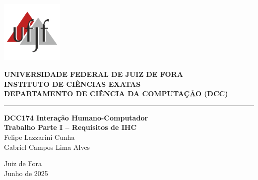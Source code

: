 \documentclass[12pt, a4paper, oneside]{abntex2}
\begin{document}
\begin{capa}
    \centering
    \begin{minipage}{0.2\textwidth}
        \includegraphics[width=3cm]{Imagens/ufjf-logo.png}
    \end{minipage}
    \hfill
    \begin{minipage}{0.7\textwidth}
        \raggedright
        \textbf{UNIVERSIDADE FEDERAL DE JUIZ DE FORA} \\
        \textbf{INSTITUTO DE CIÊNCIAS EXATAS} \\
        \textbf{DEPARTAMENTO DE CIÊNCIA DA COMPUTAÇÃO (DCC)}
    \end{minipage}
    \vspace*{3cm}
    \hrule
    \vspace*{5cm}
    \textbf{\Large DCC174 Interação Humano-Computador} \\
    \vspace{0.5cm}
    \textbf{\Large Trabalho Parte I – Requisitos de IHC} \\
    \vspace{3cm}
    Felipe Lazzarini Cunha \\
    Gabriel Campos Lima Alves \\
    \vfill
    \vspace*{1cm}
    \begin{center}
    Juiz de Fora\\
    Junho de 2025
    \end{center}
\end{capa}
\end{document}
